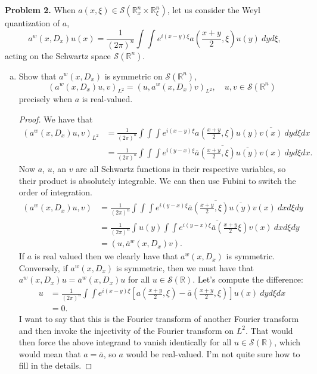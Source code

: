 \documentclass[11pt,letterpaper]{report}
\newcommand{\reals}{\mathbb{R}}
\newcommand{\mcal}[1]{\mathcal{#1}}
\begin{document}
\noindent\textbf{Problem 2. }When $a(x,\xi)\in \mcal{S}(\reals^n_x\times \reals^n_\xi)$, let us consider the Weyl quantization of $a$,
\[
a^w(x, D_x)u(x) = \frac{1}{(2\pi)^n}\int\int e^{i(x-y)\xi}a\left(\frac{x+y}{2}, \xi\right)u(y)\ dyd\xi,
\]
acting on the Schwartz space $\mcal{S}(\reals^n)$.
\begin{enumerate}[(a)]
	\item Show that $a^w(x, D_x)$ is symmetric on $\mcal{S}(\reals^n)$,
	\[
	(a^w(x, D_x)u, v)_{L^2} = (u, a^w(x, D_x)v)_{L^2},\quad u,v\in \mcal{S}(\reals^n)
	\]
	precisely when $a$ is real-valued.
	\begin{proof}
		We have that
		\begin{align*}
			(a^w(x, D_x)u, v)_{L^2} &= \frac{1}{(2\pi)^n}\int\int\int e^{i(x-y)\xi}a\left(\frac{x+y}{2}, \xi\right)u(y)\overline{v(x)}\ dyd\xi dx\\
			&= \frac{1}{(2\pi)^n}\int\int\int \overline{e^{i(y-x)\xi}\overline{a}\left(\frac{x+y}{2}, \xi\right)\overline{u(y)}v(x)}\ dyd\xi dx.
		\end{align*}
		Now $a$, $u$, an $v$ are all Schwartz functions in their respective variables, so their product is absolutely integrable. We can then use Fubini to switch the order of integration.
		\begin{align*}
			(a^w(x, D_x)u, v) &= \frac{1}{(2\pi)^n}\int\int\int \overline{e^{i(y-x)\xi}\overline{a}\left(\frac{x+y}{2}, \xi\right)\overline{u(y)}v(x)}\ dxd\xi dy\\
			&= \frac{1}{(2\pi)^n}\int u(y) \overline{\int\int e^{i(y-x)\xi}\overline{a}\left(\frac{x+y}{2}\xi\right)v(x)}\ dxd\xi dy\\
			&= (u, \overline{a}^w(x, D_x)v).
		\end{align*}
		If $a$ is real valued then we clearly have that $a^w(x, D_x)$ is symmetric. Conversely, if $a^w(x, D_x)$ is symmetric, then we must have that $a^w(x, D_x)u = \overline{a}^w(x, D_x)u$ for all $u\in \mcal{S}(\reals)$. Let's compute the difference:
		\begin{align*}
			[a^w(x, D_x) - \overline{a}^w(x, D_x)]u &= \frac{1}{(2\pi)^n}\int\int e^{i(x-y)\xi}\left[a\left(\frac{x+y}{2},\xi\right) - \overline{a}\left(\frac{x+y}{2},\xi\right)\right]u(x)\ dyd\xi dx\\
			&= 0.
		\end{align*}
		I want to say that this is the Fourier transform of another Fourier transform and then invoke the injectivity of the Fourier transform on $L^2$. That would then force the above integrand to vanish identically for all $u\in \mcal{S}(\reals)$, which would mean that $a = \overline{a}$, so $a$ would be real-valued. I'm not quite sure how to fill in the details.

\end{proof}
\end{enumerate}
\end{document}
